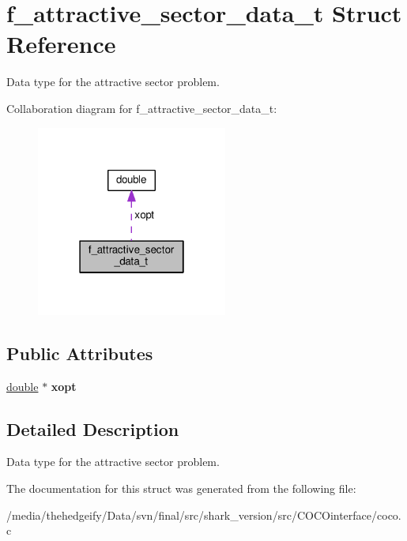 \hypertarget{structf__attractive__sector__data__t}{}\section{f\+\_\+attractive\+\_\+sector\+\_\+data\+\_\+t Struct Reference}
\label{structf__attractive__sector__data__t}


Data type for the attractive sector problem.  




Collaboration diagram for f\+\_\+attractive\+\_\+sector\+\_\+data\+\_\+t\+:\nopagebreak
\begin{figure}[H]
\begin{center}
\leavevmode
\includegraphics[width=178pt]{structf__attractive__sector__data__t__coll__graph}
\end{center}
\end{figure}
\subsection*{Public Attributes}
\begin{DoxyCompactItemize}
\item 
\hyperlink{classdouble}{double} $\ast$ {\bfseries xopt}\hypertarget{structf__attractive__sector__data__t_a7fc1c138d2e45e092ee774602e309c57}{}\label{structf__attractive__sector__data__t_a7fc1c138d2e45e092ee774602e309c57}

\end{DoxyCompactItemize}


\subsection{Detailed Description}
Data type for the attractive sector problem. 

The documentation for this struct was generated from the following file\+:\begin{DoxyCompactItemize}
\item 
/media/thehedgeify/\+Data/svn/final/src/shark\+\_\+version/src/\+C\+O\+C\+Ointerface/coco.\+c\end{DoxyCompactItemize}
